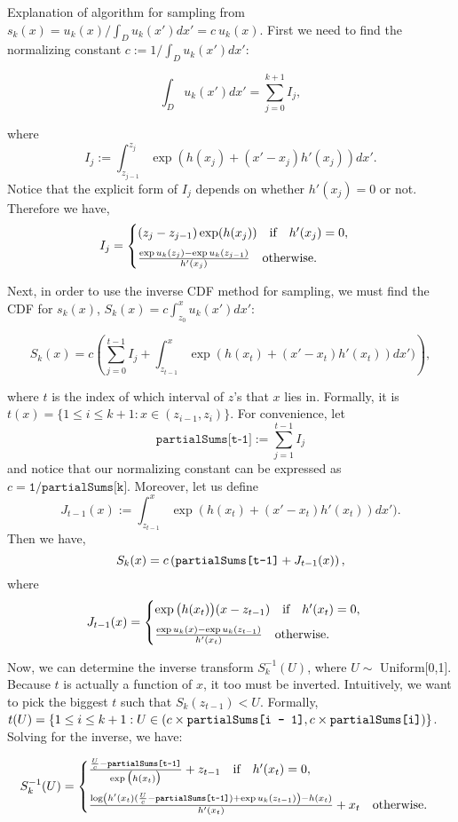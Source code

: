 \documentclass{article}
\begin{document}
Explanation of algorithm for sampling from $s_k(x) = u_k(x) / \int_D u_k(x') dx' = c \ u_k(x)$. First we need to find the normalizing constant $c := 1 / \int_D u_k(x') dx':$

$$
\int_D u_k(x') dx' = \sum_{j = 0}^{k+1} I_j,
$$

where $$I_j := \int_{z_{j-1}}^{z_j} \exp(h(x_j) + (x' - x_j) h'(x_j)) dx'.$$ Notice that the explicit form of $I_j$ depends on whether $h'(x_j)=0$ or not. Therefore we have,
$$ I_j = \begin{cases} 
	(z_j-z_{j-1}) \exp (h(x_j)) \quad \text{if} \quad h'(x_j) = 0, \vspace{2mm} \\ 
	\frac{\exp u_k(z_j)  - \exp u_k(z_{j-1}) }{h'(x_j)} \quad \text{otherwise}.
	\end{cases} $$ 

Next, in order to use the inverse CDF method for sampling, we must find the CDF for $s_k(x)$, $S_k(x) = c \int_{z_0}^x u_k(x') dx'$:

$$
S_k(x) = c \left(\sum_{j = 0}^{t - 1} I_j + \int_{z_{t-1}}^x \exp(h(x_t) + (x' - x_t) h'(x_t)) dx') \right),
$$

\noindent where $t$ is the index of which interval of $z$'s that $x$ lies in. Formally, it is $t(x) = \{1\leq i \leq k+1 : x \in (z_{i-1}, z_i)\}$. For convenience, let $$\texttt{partialSums[t-1]} := \sum_{j = 1}^{t - 1} I_j$$ and notice that our normalizing constant can be expressed as $c = \texttt{1/partialSums[k]}$. Moreover, let us define $$J_{t-1}(x) := \int_{z_{t-1}}^x \exp(h(x_t) + (x' - x_t) h'(x_t)) dx').$$ Then we have,
$$
S_k(x) = c \left(\text{\texttt{partialSums[t-1]}} + J_{t-1}(x) \right),
$$
where 
$$
J_{t-1}(x) = \begin{cases} 
	\exp\big(h(x_t)\big)(x-z_{t-1}) \quad \text{if} \quad h'(x_t) = 0, \vspace{2mm}\\
 	\frac{\exp u_k(x) - \exp u_k(z_{t-1})}{h'(x_t)} \quad \text{otherwise}.
 \end{cases}
$$


Now, we can determine the inverse transform $S_k^{-1}(U)$, where $U \sim$ Uniform[0,1]. Because $t$ is actually a function of $x$, it too must be inverted. Intuitively, we want to pick the biggest $t$ such that $S_k(z_{t-1}) < U$. Formally, $t(U) = \{ 1\leq i \leq k+1 : U \in (c \times \text{\texttt{partialSums[i - 1]}}, c\times \text{\texttt{partialSums[i]}})\}$. Solving for the inverse, we have:

$$
S_k^{-1}(U) = \begin{cases}
	\frac{\frac{U}{c} - \texttt{partialSums[t-1]}}{\exp \big(h(x_t) \big)} + z_{t-1} \quad \text{if} \quad h'(x_t) = 0, \vspace{2mm} \\
 	\frac{\log\left(h'(x_t) (\frac{U}{c} - \text{\texttt{partialSums[t-1]}}) + \exp u_k(z_{t-1})\right) - h(x_t)}{h'(x_t)} + x_t \quad \text{otherwise}.
 \end{cases}
$$
\end{document}
